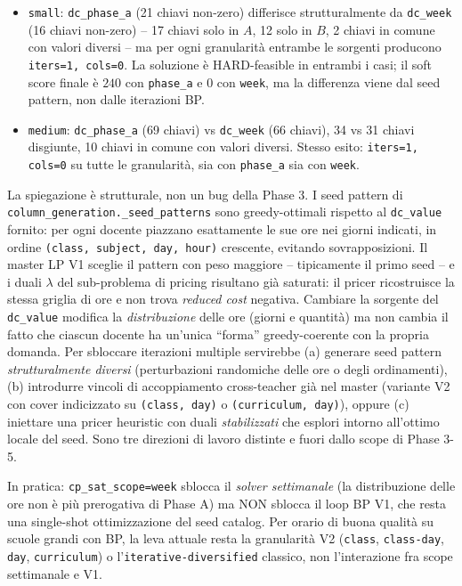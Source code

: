 \begin{itemize}
  \item \texttt{small}: \texttt{dc\_phase\_a} (21 chiavi non-zero)
        differisce strutturalmente da \texttt{dc\_week} (16 chiavi
        non-zero) -- 17 chiavi solo in $A$, 12 solo in $B$, 2
        chiavi in comune con valori diversi -- ma per ogni
        granularit\`a entrambe le sorgenti producono
        \texttt{iters=1, cols=0}. La soluzione \`e HARD-feasible
        in entrambi i casi; il soft score finale \`e $240$ con
        \texttt{phase\_a} e $0$ con \texttt{week}, ma la
        differenza viene dal seed pattern, non dalle iterazioni
        BP.
  \item \texttt{medium}: \texttt{dc\_phase\_a} (69 chiavi) vs
        \texttt{dc\_week} (66 chiavi), 34 vs 31 chiavi disgiunte,
        10 chiavi in comune con valori diversi. Stesso esito:
        \texttt{iters=1, cols=0} su tutte le granularit\`a, sia
        con \texttt{phase\_a} sia con \texttt{week}.
\end{itemize}

\noindent
La spiegazione \`e strutturale, non un bug della Phase 3. I seed
pattern di \texttt{column\_generation.\_seed\_patterns} sono
greedy-ottimali rispetto al \texttt{dc\_value} fornito: per ogni
docente piazzano esattamente le sue ore nei giorni indicati, in
ordine \texttt{(class, subject, day, hour)} crescente, evitando
sovrapposizioni. Il master LP V1 sceglie il pattern con peso
maggiore -- tipicamente il primo seed -- e i duali $\lambda$ del
sub-problema di pricing risultano gi\`a saturati: il pricer
ricostruisce la stessa griglia di ore e non trova \emph{reduced
cost} negativa. Cambiare la sorgente del \texttt{dc\_value}
modifica la \emph{distribuzione} delle ore (giorni e quantit\`a)
ma non cambia il fatto che ciascun docente ha un'unica ``forma''
greedy-coerente con la propria domanda. Per sbloccare iterazioni
multiple servirebbe (a) generare seed pattern \emph{strutturalmente
diversi} (perturbazioni randomiche delle ore o degli ordinamenti),
(b) introdurre vincoli di accoppiamento cross-teacher gi\`a nel
master (variante V2 con cover indicizzato su \texttt{(class, day)}
o \texttt{(curriculum, day)}), oppure (c) iniettare una pricer
heuristic con duali \emph{stabilizzati} che esplori intorno
all'ottimo locale del seed. Sono tre direzioni di lavoro distinte
e fuori dallo scope di Phase 3-5.

In pratica: \texttt{cp\_sat\_scope=week} sblocca il
\emph{solver settimanale} (la distribuzione delle ore non \`e
pi\`u prerogativa di Phase A) ma NON sblocca il loop BP V1, che
resta una single-shot ottimizzazione del seed catalog. Per orario
di buona qualit\`a su scuole grandi con BP, la leva attuale resta
la granularit\`a V2 (\texttt{class}, \texttt{class-day},
\texttt{day}, \texttt{curriculum}) o l'\texttt{iterative-diversified}
classico, non l'interazione fra scope settimanale e V1.

